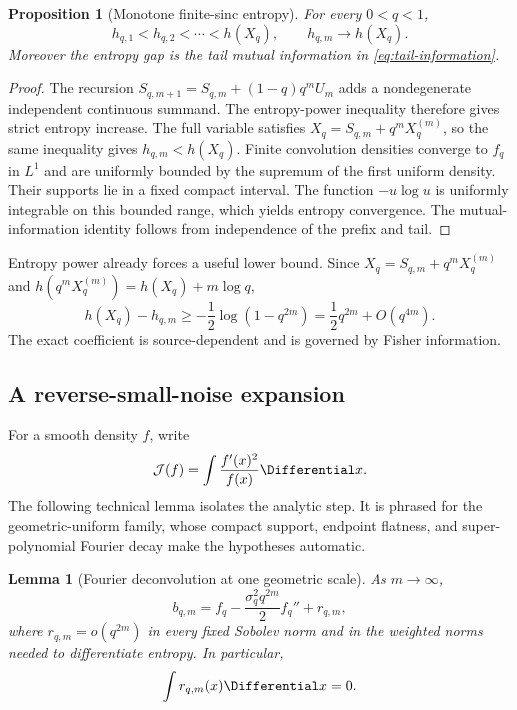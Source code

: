 \documentclass[11pt,oneside]{article}
\newtheorem{proposition}[theorem]{Proposition}
\newtheorem{lemma}[theorem]{Lemma}
\theoremstyle{definition}
\theoremstyle{remark}
\begin{document}
\begin{proposition}[Monotone finite-sinc entropy]
\label{prop:entropy-monotone}
For every $0<q<1$,
\begin{equation}
 h_{q,1}<h_{q,2}<\cdots<h(X_q),
 \qquad
 h_{q,m}\longrightarrow h(X_q).
 \label{eq:entropy-monotone}
\end{equation}
Moreover the entropy gap is the tail mutual information in
\eqref{eq:tail-information}.
\end{proposition}

\begin{proof}
The recursion
$S_{q,m+1}=S_{q,m}+(1-q)q^mU_m$ adds a nondegenerate independent continuous
summand.  The entropy-power inequality therefore gives strict entropy increase.
The full variable satisfies $X_q=S_{q,m}+q^mX_q^{(m)}$, so the same inequality
gives $h_{q,m}<h(X_q)$.  Finite convolution densities converge to $f_q$ in
$L^1$ and are uniformly bounded by the supremum of the first uniform density.
Their supports lie in a fixed compact interval.  The function $-u\log u$ is
uniformly integrable on this bounded range, which yields entropy convergence.
The mutual-information identity follows from independence of the prefix and tail.
\end{proof}

Entropy power already forces a useful lower bound.  Since
$X_q=S_{q,m}+q^mX_q^{(m)}$ and $h(q^mX_q^{(m)})=h(X_q)+m\log q$,
\begin{equation}
 h(X_q)-h_{q,m}
 \ge-\frac12\log(1-q^{2m})
 =\frac12q^{2m}+O(q^{4m}).
 \label{eq:EPI-gap}
\end{equation}
The exact coefficient is source-dependent and is governed by Fisher information.

\subsection{A reverse-small-noise expansion}

For a smooth density $f$, write
\begin{equation}
 \mathcal J(f)=\int\frac{f'(x)^2}{f(x)}\Differential x.
 \label{eq:Fisher-def}
\end{equation}
The following technical lemma isolates the analytic step.  It is phrased for the
geometric-uniform family, whose compact support, endpoint flatness, and
super-polynomial Fourier decay make the hypotheses automatic.

\begin{lemma}[Fourier deconvolution at one geometric scale]
\label{lem:deconvolution}
As $m\to\infty$,
\begin{equation}
 b_{q,m}
 =f_q-\frac{\sigma_q^2q^{2m}}2f_q''+r_{q,m},
 \label{eq:density-deconvolution}
\end{equation}
where $r_{q,m}=o(q^{2m})$ in every fixed Sobolev norm and in the weighted norms
needed to differentiate entropy.  In particular,
\begin{equation}
 \int r_{q,m}(x)\Differential x=0.
 \label{eq:remainder-mass}
\end{equation}
\end{lemma}
\end{document}
